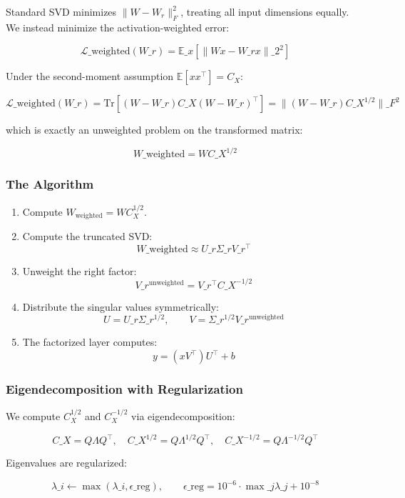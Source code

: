 Standard SVD minimizes $\|W - W_r\|_F^2$, treating all input dimensions 
equally. We instead minimize the activation-weighted error:

\[
\mathcal{L}\_\text{weighted}(W\_r) = \mathbb{E}\_{x}\!\left[\|W x - W\_r x\|\_2^2\right]
\tag{4.5}
\]

Under the second-moment assumption $\mathbb{E}[x x^\top] = C_X$:

\[
\mathcal{L}\_\text{weighted}(W\_r) = \mathrm{Tr}\!\left[(W - W\_r) C\_X (W - W\_r)^\top\right] = \|(W - W\_r) C\_X^{1/2}\|\_F^2
\tag{4.6}
\]

which is exactly an unweighted problem on the transformed matrix:

\[
W\_\text{weighted} = W C\_X^{1/2}
\tag{4.7}
\]

\subsubsection{The Algorithm}

\begin{enumerate}
\item Compute $W_\text{weighted} = W C_X^{1/2}$.
\item Compute the truncated SVD:
  $$
  W\_\text{weighted} \approx U\_r \Sigma\_r V\_r^\top
  \tag{4.8}
  $$
\item Unweight the right factor:
  $$
  V\_r^\text{unweighted} = V\_r^\top C\_X^{-1/2}
  \tag{4.9}
  $$
\item Distribute the singular values symmetrically:
  $$
  U = U\_r \Sigma\_r^{1/2}, \qquad
  V = \Sigma\_r^{1/2} V\_r^\text{unweighted}
  \tag{4.10}
  $$
\item The factorized layer computes:
  $$
  y = (x V^\top) U^\top + b
  \tag{4.11}
  $$

\end{enumerate}
\subsubsection{Eigendecomposition with Regularization}

We compute $C_X^{1/2}$ and $C_X^{-1/2}$ via eigendecomposition:

\[
C\_X = Q \Lambda Q^\top, \quad
C\_X^{1/2} = Q \Lambda^{1/2} Q^\top, \quad
C\_X^{-1/2} = Q \Lambda^{-1/2} Q^\top
\tag{4.12}
\]

Eigenvalues are regularized:

\[
\lambda\_i \leftarrow \max(\lambda\_i, \epsilon\_\text{reg}), \qquad
\epsilon\_\text{reg} = 10^{-6} \cdot \max\_j \lambda\_j + 10^{-8}
\tag{4.13}
\]

